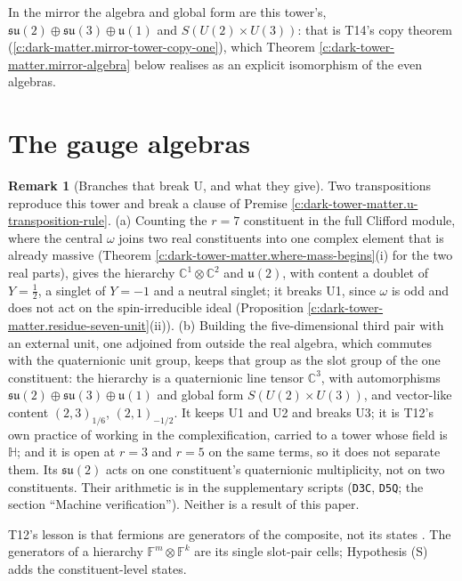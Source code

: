 \documentclass[11pt]{article}
\theoremstyle{definition}
\newtheorem{remark}[theorem]{Remark}
\theoremstyle{plain}
\newcommand{\changedmark}[2]{\marginpar{\raggedright\scriptsize\color{#1}#2}}
\providecommand{\C}{}\renewcommand{\C}{\mathbb{C}}
\providecommand{\F}{}\renewcommand{\F}{\mathbb{F}}
\providecommand{\HH}{}\renewcommand{\HH}{\mathbb{H}}
\providecommand{\su}{}\renewcommand{\su}{\mathfrak{su}}
\providecommand{\uu}{}\renewcommand{\uu}{\mathfrak{u}}
\providecommand{\file}{}\renewcommand{\file}[1]{\texttt{#1}}
\begin{document}
\label{c:note.dark-tower-matter.setting-gauge-algebras}
In the mirror the algebra and global form are this tower's, $\su(2) \oplus \su(3) \oplus \uu(1)$ and $S(U(2) \times U(3))$: that is T14's copy theorem (\ref{c:dark-matter.mirror-tower-copy-one}), which Theorem \ref{c:dark-tower-matter.mirror-algebra} below realises as an explicit isomorphism of the even algebras.

\section{The gauge algebras}

\begin{remark}[Branches that break U, and what they give]\label{c:note.dark-tower-matter.branches-break-u-what-they-give}
\changedmark{gray}{reworded}
Two transpositions reproduce this tower and break a clause of Premise \ref{c:dark-tower-matter.u-transposition-rule}. (a) Counting the $r = 7$ constituent in the full Clifford module, where the central $\omega$ joins two real constituents into one complex element that is already massive (Theorem \ref{c:dark-tower-matter.where-mass-begins}(i) for the two real parts), gives the hierarchy $\C^{1} \otimes \C^{2}$ and $\uu(2)$, with content a doublet of $Y = \tfrac{1}{2}$, a singlet of $Y = -1$ and a neutral singlet; it breaks U1, since $\omega$ is odd and does not act on the spin-irreducible ideal (Proposition \ref{c:dark-tower-matter.residue-seven-unit}(ii)). (b) Building the five-dimensional third pair with an external unit, one adjoined from outside the real algebra, which commutes with the quaternionic unit group, keeps that group as the slot group of the one constituent: the hierarchy is a quaternionic line tensor $\C^{3}$, with automorphisms $\su(2) \oplus \su(3) \oplus \uu(1)$ and global form $S(U(2) \times U(3))$, and vector-like content $(2,3)_{1/6}$, $(2,1)_{-1/2}$. It keeps U1 and U2 and breaks U3; it is T12's own practice of working in the complexification, carried to a tower whose field is $\HH$; and it is open at $r = 3$ and $r = 5$ on the same terms, so it does not separate them. Its $\su(2)$ acts on one constituent's quaternionic multiplicity, not on two constituents. Their arithmetic is in the supplementary scripts (\file{D3C}, \file{D5Q}; the section ``Machine verification''). Neither is a result of this paper.
\end{remark}

\label{c:note.dark-tower-matter.setting-content}
T12's lesson is that fermions are generators of the composite, not its states \cite[Rem.~5.2, Prop.~5.3]{ButlerT12}. The generators of a hierarchy $\F^{m} \otimes \F^{k}$ are its single slot-pair cells; Hypothesis (S) adds the constituent-level states.
\end{document}
